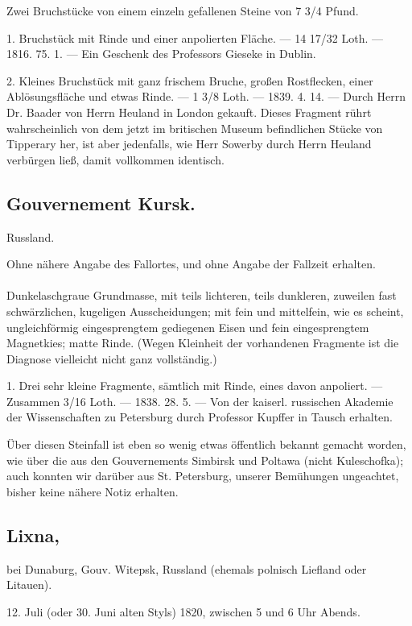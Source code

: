 \documentclass[a4paper, 11pt, oneside, polutonikogreek, german]{article}
\begin{document}
Zwei Bruchstücke von einem einzeln gefallenen Steine von 7 3/4 Pfund.

1. Bruchstück mit Rinde und einer anpolierten Fläche. — 14 17/32 Loth. — 1816. 75. 1. — Ein Geschenk des Professors Gieseke in Dublin.

2. Kleines Bruchstück mit ganz frischem Bruche, großen Rostflecken, einer Ablösungsfläche und etwas Rinde. — 1 3/8 Loth. — 1839. 4. 14. — Durch Herrn Dr. Baader von Herrn Heuland in London gekauft. Dieses Fragment rührt wahrscheinlich von dem jetzt im britischen Museum befindlichen Stücke von Tipperary her, ist aber jedenfalls, wie Herr Sowerby durch Herrn Heuland verbürgen ließ, damit vollkommen identisch.
\subsection{Gouvernement Kursk.}
\begin{center}
\small
Russland.

Ohne nähere Angabe des Fallortes, und ohne Angabe der Fallzeit erhalten.
\end{center}
\paragraph{}
Dunkelaschgraue Grundmasse, mit teils lichteren, teils dunkleren, zuweilen fast schwärzlichen, kugeligen Ausscheidungen; mit fein und mittelfein, wie es scheint, ungleichförmig eingesprengtem gediegenen Eisen und fein eingesprengtem Magnetkies; matte Rinde. (Wegen Kleinheit der vorhandenen Fragmente ist die Diagnose vielleicht nicht ganz vollständig.)

1. Drei sehr kleine Fragmente, sämtlich mit Rinde, eines davon anpoliert. — Zusammen 3/16 Loth. — 1838. 28. 5. — Von der kaiserl. russischen Akademie der Wissenschaften zu Petersburg durch Professor Kupffer in Tausch erhalten.

Über diesen Steinfall ist eben so wenig etwas öffentlich bekannt gemacht worden, wie über die aus den Gouvernements Simbirsk und Poltawa (nicht Kuleschofka); auch konnten wir darüber aus St. Petersburg, unserer Bemühungen ungeachtet, bisher keine nähere Notiz erhalten.
\subsection[Lixna.]{Lixna,}
\begin{center}
\small
bei Dunaburg, Gouv. Witepsk, Russland (ehemals polnisch Liefland oder Litauen).

12. Juli (oder 30. Juni alten Styls) 1820, zwischen 5 und 6 Uhr Abends.
\end{center}
\end{document}
